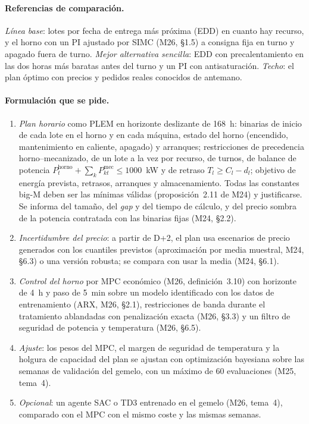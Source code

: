 \paragraph{Referencias de comparación.} \emph{Línea base}: lotes por fecha de entrega más próxima (EDD) en cuanto hay recurso, y el horno con un PI ajustado por SIMC (M26, §1.5) a consigna fija en turno y apagado fuera de turno. \emph{Mejor alternativa sencilla}: EDD con precalentamiento en las dos horas más baratas antes del turno y un PI con antisaturación. \emph{Techo}: el plan óptimo con precios y pedidos reales conocidos de antemano.

\paragraph{Formulación que se pide.}
\begin{enumerate}[label=F\arabic*.]
  \item \emph{Plan horario} como PLEM en horizonte deslizante de 168~h: binarias de inicio de cada lote en el horno y en cada máquina, estado del horno (encendido, mantenimiento en caliente, apagado) y arranques; restricciones de precedencia horno–mecanizado, de un lote a la vez por recurso, de turnos, de balance de potencia $P_t^{\mathrm{horno}}+\sum_kP_{kt}^{\mathrm{mec}}\le 1000$~kW y de retraso $T_l\ge C_l-d_l$; objetivo de energía prevista, retrasos, arranques y almacenamiento. Todas las constantes big-M deben ser las mínimas válidas (proposición~2.11 de M24) y justificarse. Se informa del tamaño, del \emph{gap} y del tiempo de cálculo, y del precio sombra de la potencia contratada con las binarias fijas (M24, §2.2).
  \item \emph{Incertidumbre del precio}: a partir de D+2, el plan usa escenarios de precio generados con los cuantiles previstos (aproximación por media muestral, M24, §6.3) o una versión robusta; se compara con usar la media (M24, §6.1).
  \item \emph{Control del horno} por MPC económico (M26, definición~3.10) con horizonte de 4~h y paso de 5~min sobre un modelo identificado con los datos de entrenamiento (ARX, M26, §2.1), restricciones de banda durante el tratamiento ablandadas con penalización exacta (M26, §3.3) y un filtro de seguridad de potencia y temperatura (M26, §6.5).
  \item \emph{Ajuste}: los pesos del MPC, el margen de seguridad de temperatura y la holgura de capacidad del plan se ajustan con optimización bayesiana sobre las semanas de validación del gemelo, con un máximo de 60 evaluaciones (M25, tema~4).
  \item \emph{Opcional}: un agente SAC o TD3 entrenado en el gemelo (M26, tema~4), comparado con el MPC con el mismo coste y las mismas semanas.
\end{enumerate}

